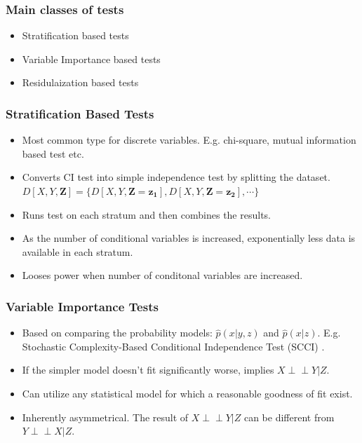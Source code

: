 \documentclass{beamer}
\def\ci{\perp\!\!\!\!\!\perp}
\begin{document}
\begin{frame}
	\frametitle{Main classes of tests}
	\begin{itemize}
		\setlength\itemsep{1em}
		\item Stratification based tests
		\item Variable Importance based tests
		\item Residulaization based tests
	\end{itemize}
\end{frame}

\begin{frame}
	\frametitle{Stratification Based Tests}
	\begin{itemize}
		\setlength\itemsep{1em}
		\item Most common type for discrete variables. E.g. chi-square,
			mutual information based test etc. 
		\item Converts CI test into simple independence test by splitting 
			the dataset.
		$ D[X, Y, \bm{Z}] = \{ D[X, Y, \bm{Z}=\bm{z_1}], D[X, Y, \bm{Z}=\bm{z_2}], \cdots \} $	
		\item Runs test on each stratum and then combines the results.
		\item As the number of conditional variables is increased, exponentially
			less data is available in each stratum.
		\item Looses power when number of conditonal variables
			are increased.
	\end{itemize}
\end{frame}

\begin{frame}
	\frametitle{Variable Importance Tests}
	\begin{itemize}
		\setlength\itemsep{1em}
		\item Based on comparing the probability models: $\hat{p}(x |
			y, z) $ and $ \hat{p}(x | z) $. E.g. Stochastic
			Complexity-Based Conditional Independence Test (SCCI) \footnotemark.
		\item If the simpler model doesn't fit significantly worse, implies $ X \ci Y | Z $.
		\item Can utilize any statistical model for which a reasonable goodness
			of fit exist.
		\item Inherently asymmetrical. The result of $ X \ci Y | Z $
			can be different from $ Y \ci X | Z $.
	\end{itemize}

\end{frame}
\end{document}
